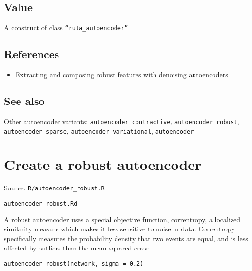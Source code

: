 \hypertarget{value}{\subsection{\texorpdfstring{\protect\hyperlink{value}{}Value}{Value}}\label{value}}

A construct of class \texttt{``ruta\_autoencoder''}

\hypertarget{references}{\subsection{\texorpdfstring{\protect\hyperlink{references}{}References}{References}}\label{references}}

\begin{itemize}
\tightlist
\item
  \href{https://dl.acm.org/citation.cfm?id=1390294}{Extracting and
  composing robust features with denoising autoencoders}
\end{itemize}

\hypertarget{see-also}{\subsection{\texorpdfstring{\protect\hyperlink{see-also}{}See
also}{See also}}\label{see-also}}

Other autoencoder variants: \texttt{autoencoder\_contractive},
\texttt{autoencoder\_robust}, \texttt{autoencoder\_sparse},
\texttt{autoencoder\_variational}, \texttt{autoencoder}

\section{Create a robust autoencoder}\label{create-a-robust-autoencoder}

Source:
\href{https://github.com/fdavidcl/ruta/blob/master/R/autoencoder_robust.R}{\texttt{R/autoencoder\_robust.R}}

\texttt{autoencoder\_robust.Rd}

A robust autoencoder uses a special objective function, correntropy, a
localized similarity measure which makes it less sensitive to noise in
data. Correntropy specifically measures the probability density that two
events are equal, and is less affected by outliers than the mean squared
error.

\begin{verbatim}
autoencoder_robust(network, sigma = 0.2)
\end{verbatim}

